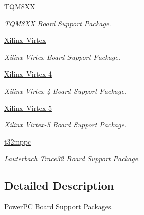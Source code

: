 \begin{DoxyCompactItemize}
\mbox{\hyperlink{group__RTEMSBSPsPowerPCTQM8XX}{T\+Q\+M8\+XX}}
\begin{DoxyCompactList}\small\item\em T\+Q\+M8\+XX Board Support Package. \end{DoxyCompactList}\item 
\mbox{\hyperlink{group__RTEMSBSPsPowerPCVirtex}{Xilinx Virtex}}
\begin{DoxyCompactList}\small\item\em Xilinx Virtex Board Support Package. \end{DoxyCompactList}\item 
\mbox{\hyperlink{group__RTEMSBSPsPowerPCVirtex4}{Xilinx Virtex-\/4}}
\begin{DoxyCompactList}\small\item\em Xilinx Virtex-\/4 Board Support Package. \end{DoxyCompactList}\item 
\mbox{\hyperlink{group__RTEMSBSPsPowerPCVirtex5}{Xilinx Virtex-\/5}}
\begin{DoxyCompactList}\small\item\em Xilinx Virtex-\/5 Board Support Package. \end{DoxyCompactList}\item 
\mbox{\hyperlink{group__RTEMSBSPsPowerPCT32MPPC}{t32mppc}}
\begin{DoxyCompactList}\small\item\em Lauterbach Trace32 Board Support Package. \end{DoxyCompactList}\end{DoxyCompactItemize}


\subsection{Detailed Description}
Power\+PC Board Support Packages. 

